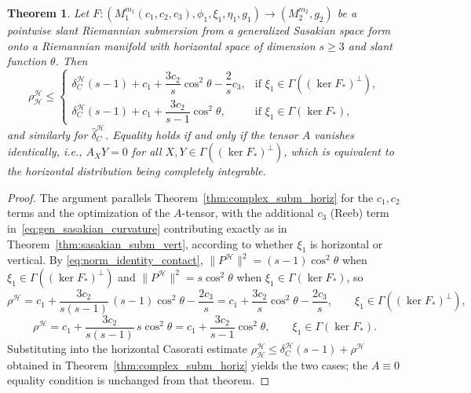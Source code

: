 \documentclass[11pt]{amsart}
\theoremstyle{plain}
\newtheorem{theorem}{Theorem}[section]
\theoremstyle{definition}
\theoremstyle{remark}
\newcommand{\calH}{\mathcal{H}}
\begin{document}
\begin{theorem}\label{thm:sasakian_subm_horiz}
Let $F:(M_1^{m_1}(c_1,c_2,c_3),\phi_1,\xi_1,\eta_1,g_1)\to (M_2^{m_2},g_2)$ be a pointwise slant Riemannian submersion from a generalized Sasakian space form onto a Riemannian manifold with horizontal space of dimension $s\ge 3$ and slant function $\theta$. Then
\begin{equation}\label{eq:sasakian_horiz}
\rho_{\calH}^{\calH} \le \begin{cases}
\delta_C^{\calH}(s-1) + c_1 + \dfrac{3c_2}{s}\cos^2\theta - \dfrac{2}{s}c_3, & \text{if } \xi_1 \in \Gamma((\ker F_*)^\perp),\\[6pt]
\delta_C^{\calH}(s-1) + c_1 + \dfrac{3c_2}{s-1}\cos^2\theta, & \text{if } \xi_1 \in \Gamma(\ker F_*),
\end{cases}
\end{equation}
and similarly for $\hat{\delta}_C^{\calH}$. Equality holds if and only if the tensor $A$ vanishes identically, i.e., 
$A_XY = 0$ for all $X,Y \in \Gamma((\ker F_*)^\perp)$, which is equivalent 
to the horizontal distribution being completely integrable.
\end{theorem}
\begin{proof}
The argument parallels Theorem~\ref{thm:complex_subm_horiz} for the
$c_1,c_2$ terms and the optimization of the $A$-tensor, with the
additional $c_3$ (Reeb) term in~\eqref{eq:gen_sasakian_curvature}
contributing exactly as in Theorem~\ref{thm:sasakian_subm_vert},
according to whether $\xi_1$ is horizontal or vertical. By
\eqref{eq:norm_identity_contact},
$\|P^{\calH}\|^2=(s-1)\cos^2\theta$ when $\xi_1\in\Gamma((\ker F_*)^{\perp})$
and $\|P^{\calH}\|^2=s\cos^2\theta$ when $\xi_1\in\Gamma(\ker F_*)$, so
\[
\rho^{\calH}
= c_1+\frac{3c_2}{s(s-1)}\,(s-1)\cos^2\theta-\frac{2c_3}{s}
= c_1+\frac{3c_2}{s}\cos^2\theta-\frac{2c_3}{s},
\qquad \xi_1\in\Gamma((\ker F_*)^{\perp}),
\]
\[
\rho^{\calH}
= c_1+\frac{3c_2}{s(s-1)}\,s\cos^2\theta
= c_1+\frac{3c_2}{s-1}\cos^2\theta,
\qquad \xi_1\in\Gamma(\ker F_*).
\]
Substituting into the horizontal Casorati estimate
$\rho_{\calH}^{\calH}\leq\delta_C^{\calH}(s-1)+\rho^{\calH}$ obtained in
Theorem~\ref{thm:complex_subm_horiz} yields the two cases; the
$A\equiv0$ equality condition is unchanged from that theorem.
\end{proof}
\end{document}

